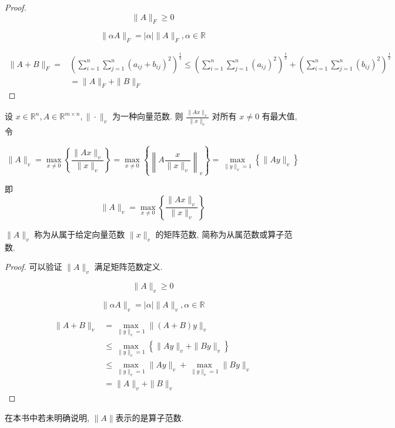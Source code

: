 \begin{proof}
    $$ \|A\|_{F} \geq 0 $$

    $$ \|\alpha A\|_{F}=|\alpha|\|A\|_{F}, \alpha \in \mathbb{R} $$

    $$ \begin{aligned}\|A+B\|_{F}=&\left(\sum_{i=1}^{n} \sum_{j=1}^{n}\left(a_{i j}+b_{i j}\right)^{2}\right)^{\frac{1}{2}} \leq\left(\sum_{i=1}^{n} \sum_{j=1}^{n}\left(a_{i j}\right)^{2}\right)^{\frac{1}{2}}+\left(\sum_{i=1}^{n} \sum_{j=1}^{n}\left(b_{i j}\right)^{2}\right)^{\frac{1}{2}} \\ &=\|A\|_{F}+\|B\|_{F} \end{aligned} $$
\end{proof}

\begin{definition}
    设 $ x \in \mathbb{R}^{n}, A \in \mathbb{R}^{m \times n},\|\cdot\|_{v} $ 为一种向量范数. 则 $ \frac{\|A x\|_{v}}{\|x\|_{v}} $ 对所有 $ x \neq 0 $ 有最大值, 令

    $$ \|A\|_{v}=\max _{x \neq 0}\left\{\frac{\|A x\|_{v}}{\|x\|_{v}}\right\}=\max _{x \neq 0}\left\{\left\|A \frac{x}{\|x\|_{v}}\right\|_{v}\right\}=\max _{\|y\|_{v}=1}\left\{\|A y\|_{v}\right\} $$

    即$$ \|A\|_{v}=\max _{x \neq 0}\left\{\frac{\|A x\|_{v}}{\|x\|_{v}}\right\} $$

    $ \|A\|_{v} $ 称为从属于给定向量范数 $ \|x\|_{v} $ 的矩阵范数, 简称为从属范数或算子范数.
\end{definition}

\begin{proof}
    可以验证 $ \|A\|_{v} $ 满足矩阵范数定义. 

    $$ \|A\|_{v} \geq 0 $$

    $$ \|\alpha A\|_{v}=|\alpha|\|A\|_{v}, \alpha \in \mathbb{R} $$

    $$\begin{aligned}
        \|A+B\|_{v} &=\max _{\|y\|_{v}=1}\|(A+B) y\|_{v} \\
        &\leq \max _{\|y\|_{v}=1}\left\{\|A y\|_{v}+\|B y\|_{v}\right\} \\
        & \leq \max _{\|y\|_{v}=1}\|A y\|_{v}+\max _{\|y\|_{v}=1}\|B y\|_{v} \\
        & =\|A\|_{v}+\|B\|_{v}
    \end{aligned}$$

\end{proof}

\begin{remark}
    在本书中若未明确说明, $\|A \|$表示的是算子范数.
\end{remark}

